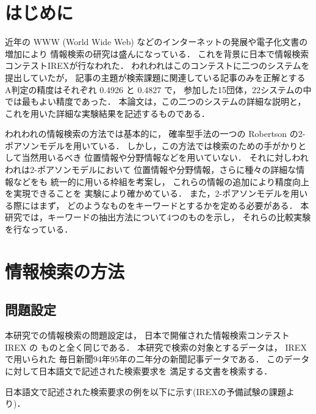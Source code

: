 

\maketitle


\section{はじめに}
近年の WWW (World Wide Web) などのインターネットの発展や電子化文書の増加により
情報検索\cite{ir_tokunaga,ir_doukou,Fujita99}の研究は盛んになっている．
これを背景に日本で情報検索コンテストIREXが行なわれた．
われわれはこのコンテストに二つのシステムを提出していたが，
記事の主題が検索課題に関連している記事のみを正解とする
A判定の精度はそれぞれ 0.4926 と 0.4827 で，
参加した15団体，22システムの中では最もよい精度であった．
本論文は，この二つのシステムの詳細な説明と，
これを用いた詳細な実験結果を記述するものである．


われわれの情報検索の方法では基本的に，
確率型手法の一つの Robertson の2-ポアソンモデル\cite{2poisson}を用いている．
しかし，この方法では検索のための手がかりとして当然用いるべき
位置情報や分野情報などを用いていない．
それに対しわれわれは2-ポアソンモデルにおいて
位置情報や分野情報，さらに種々の詳細な情報などをも
統一的に用いる枠組を考案し，
これらの情報の追加により精度向上を実現できることを
実験により確かめている．
また，2-ポアソンモデルを用いる際にはまず，
どのようなものをキーワードとするかを定める必要がある．
本研究では，キーワードの抽出方法について4つのものを示し，
それらの比較実験を行なっている．

\section{情報検索の方法}

\subsection{問題設定}

本研究での情報検索の問題設定は，
日本で開催された情報検索コンテスト IREX\cite{irex1_Sekine_eng} の
ものと全く同じである．
本研究で検索の対象とするデータは，
IREX で用いられた
毎日新聞94年95年の二年分の新聞記事データである．
このデータに対して日本語文で記述された検索要求を
満足する文書を検索する．

日本語文で記述された検索要求の例を以下に示す(IREXの予備試験の課題より)．

